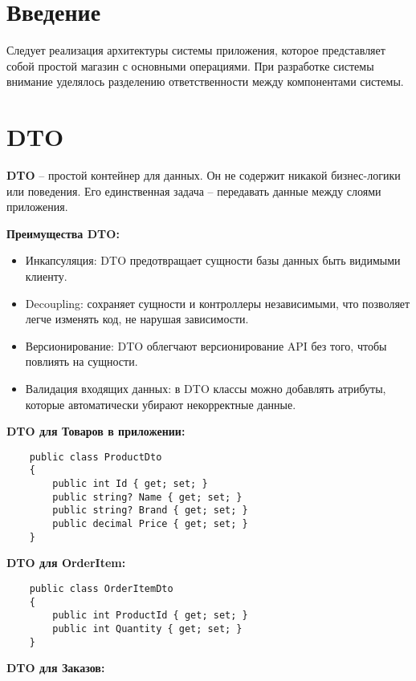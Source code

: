 \documentclass[a4paper,12pt]{report}
\begin{document}
\section{Введение}

Следует реализация архитектуры системы приложения, которое представляет собой простой магазин с основными операциями. 
При разработке системы внимание уделялось разделению ответственности между компонентами системы.

\section{\acs{DTO}}

\textbf{\acs{DTO}} -- простой контейнер для данных. Он не содержит никакой бизнес-логики или поведения.
Его единственная задача -- передавать данные между слоями приложения.

\textbf{Преимущества \acs{DTO}:}
\begin{itemize}
    \item
        Инкапсуляция: \acs{DTO} предотвращает сущности базы данных быть видимыми клиенту.
    \item
        Decoupling: сохраняет сущности и контроллеры независимыми, что позволяет легче изменять
        код, не нарушая зависимости.
    \item
        Версионирование: \acs{DTO} облегчают версионирование \acs{API} без того, чтобы повлиять на сущности.
    \item
        Валидация входящих данных: в \acs{DTO} классы можно добавлять атрибуты, которые автоматически убирают 
        некорректные данные.\cite{dto}
\end{itemize}

\textbf{\acs{DTO} для Товаров в приложении:}

\begin{verbatim}
    public class ProductDto
    {
        public int Id { get; set; } 
        public string? Name { get; set; }
        public string? Brand { get; set; }
        public decimal Price { get; set; }
    }
\end{verbatim}

\textbf{\acs{DTO} для OrderItem:}

\begin{verbatim}
    public class OrderItemDto
    {
        public int ProductId { get; set; }
        public int Quantity { get; set; }
    }
\end{verbatim}

\textbf{\acs{DTO} для Заказов:}
\end{document}
